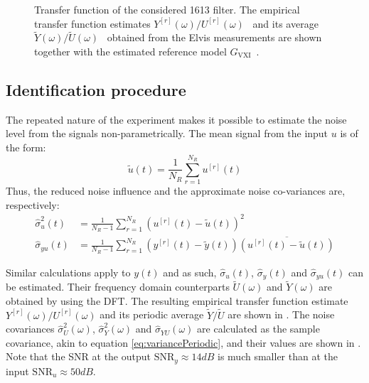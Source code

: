 \begin{figure}
  \centering
  \setlength{\figurewidth}{0.75\columnwidth}
  \setlength{\figureheight}{0.68\figurewidth}
  
  \caption[\BK{} 1613 filter transfer function]{Transfer function of the considered \BK{} 1613 filter.
  The empirical transfer function estimates $Y^{[r]}(\omega)/U^{[r]}(\omega)$~ and its average $\tilde{Y}(\omega)/\tilde{U}(\omega)$~ obtained from the Elvis measurements are shown together with the estimated reference model $G_{\mathrm{VXI}}$~.} 
  \label{fig:bk1613}
\end{figure}


\subsection{Identification procedure}
The repeated nature of the experiment makes it possible to estimate the noise level from the signals non-parametrically.
The mean signal from the input $u$ is of the form:
\begin{equation}
  \tilde{u}(t) = \frac{1}{N_R} \sum_{r=1}^{N_R} u^{[r]}(t)
\end{equation}
Thus, the reduced noise influence and the approximate noise co-variances are, respectively:
\begin{align}
  \hat\sigma_{u}^2(t) &= \frac{1}{N_R - 1} 
                    \sum_{r=1}^{N_R} 
                    \left( u^{[r]}(t) - \tilde{u}(t) \right)^2 \\
  \hat\sigma_{yu}(t) &= \frac{1}{N_R - 1} 
                    \sum_{r=1}^{N_R} 
                    \left( y^{[r]}(t) - \tilde{y}(t) \right)
                    \overline{\left( u^{[r]}(t) - \tilde{u}(t) \right)}
  \label{eq:variancePeriodic}            
\end{align}
 
Similar calculations apply to $y(t)$ and as such, $\hat\sigma_u(t)$, $\hat\sigma_y(t)$ and $\hat\sigma_{yu}(t)$ can be estimated.
Their frequency domain counterparts $\tilde{U}(\omega)$ and $\tilde{Y}(\omega)$ are obtained by using the DFT.
The resulting empirical transfer function estimate $Y^{[r]}(\omega)/U^{[r]}(\omega)$ and its periodic average $\tilde{Y}/\tilde{U}$ are shown in .
The noise covariances $\hat\sigma^2_{U}(\omega)$, $\hat\sigma^2_{Y}(\omega)$ and  $\hat\sigma_{YU}(\omega)$ are calculated as the sample covariance, akin to equation \eqref{eq:variancePeriodic}, and their values are shown in .
Note that the SNR at the output $\mathrm{SNR}_{y} \approx 14 \unit{dB}$ is much smaller than at the input $\mathrm{SNR}_{u} \approx 50 \unit{dB}$.

